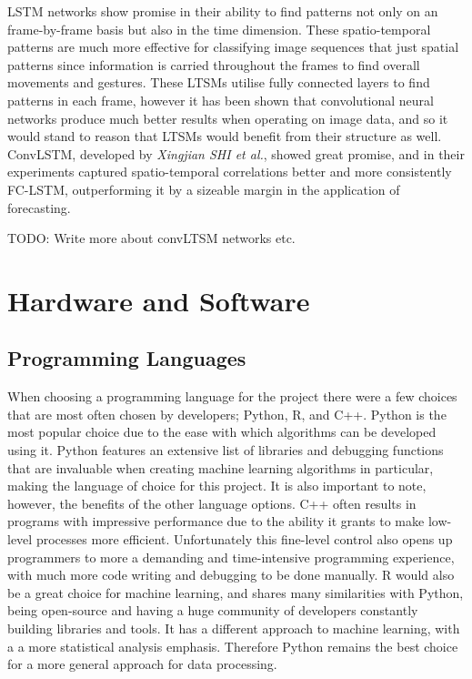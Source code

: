 LSTM networks show promise in their ability to find patterns not only on an frame-by-frame basis but also in the time dimension. These spatio-temporal patterns are much more effective for classifying image sequences that just spatial patterns since information is carried throughout the frames to find overall movements and gestures. These LTSMs utilise fully connected layers to find patterns in each frame, however it has been shown that convolutional neural networks produce much better results when operating on image data, and so it would stand to reason that LTSMs would benefit from their structure as well. ConvLSTM, developed by \textit{Xingjian SHI et al.}, showed great promise, and in their experiments captured spatio-temporal correlations better and more consistently FC-LSTM, outperforming it by a sizeable margin in the application of forecasting.

\color{red} TODO: Write more about convLTSM networks etc. \color{black}

\section{Hardware and Software}

\subsection{Programming Languages}

When choosing a programming language for the project there were a few choices that are most often chosen by developers; Python\cite{Python}, R\cite{R}, and C++\cite{C++}. Python is the most popular choice due to the ease with which algorithms can be developed using it. Python features an extensive list of libraries and debugging functions that are invaluable when creating machine learning algorithms in particular, making the language of choice for this project. It is also important to note, however, the benefits of the other language options. C++ often results in programs with impressive performance due to the ability it grants to make low-level processes more efficient. Unfortunately this fine-level control also opens up programmers to more a demanding and time-intensive programming experience, with much more code writing and debugging to be done manually. R would also be a great choice for machine learning, and shares many similarities with Python, being open-source and having a huge community of developers constantly building libraries and tools. It has a different approach to machine learning, with a a more statistical analysis emphasis. Therefore Python remains the best choice for a more general approach for data processing.

